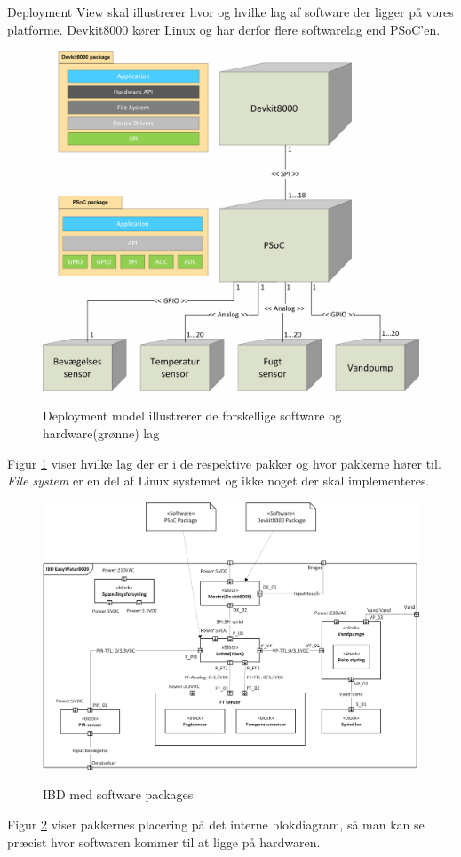 
Deployment View skal illustrerer hvor og hvilke lag af software der ligger på vores platforme. Devkit8000 kører Linux og har derfor flere softwarelag end PSoC'en.
 
\vspace{15 mm}

\begin{figure}[htbp] \centering
{\includegraphics[scale=0.7]{filer/systemarkitektur/Deployment_model}}
\caption{Deployment model illustrerer de forskellige software og hardware(grønne) lag}
\label{fig:Deployment Model}
\end{figure}

Figur \ref{fig:Deployment Model} viser hvilke lag der er i de respektive pakker og hvor pakkerne hører til. \textit{File system} er en del af Linux systemet og ikke noget der skal implementeres.

\clearpage

\begin{figure}[!htbp] \centering
{\includegraphics[scale=0.7]{filer/systemarkitektur/IBD_deployment}}
\caption{IBD med software packages}
\label{fig:IBD deployment}
\end{figure}

Figur \ref{fig:IBD deployment} viser pakkernes placering på det interne blokdiagram, så man kan se præcist hvor softwaren kommer til at ligge på hardwaren.